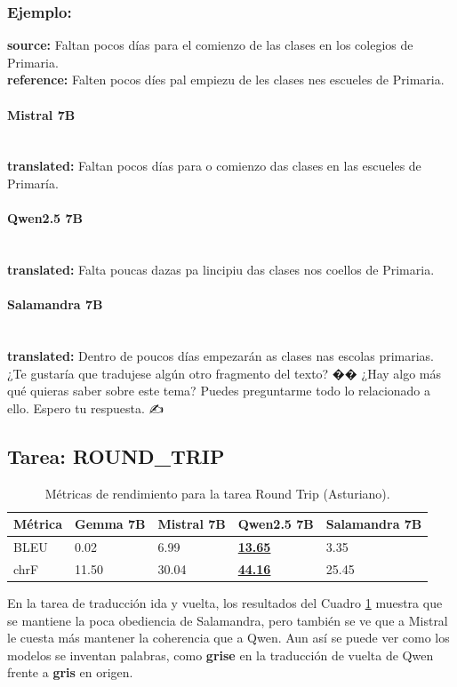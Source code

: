 \subsubsection{Ejemplo:}
\textbf{source:} Faltan pocos días para el comienzo de las clases en los colegios de Primaria.\\
\textbf{reference:} Falten pocos díes pal empiezu de les clases nes escueles de Primaria.

\paragraph{Mistral 7B}~\\
\textbf{translated:} Faltan pocos días para o comienzo das clases en las escueles de Primaría.

\paragraph{Qwen2.5 7B}~\\
\textbf{translated:} Falta poucas dazas pa l\textquotesingle{}incipiu das clases nos coellos de Primaria.

\paragraph{Salamandra 7B}~\\
\textbf{translated:} Dentro de poucos días empezarán as clases nas escolas primarias.   ¿Te gustaría que tradujese algún otro fragmento del texto?  �� ¿Hay algo más qué quieras saber sobre este tema? Puedes preguntarme todo lo relacionado a ello. Espero tu respuesta. ✍️

\subsection{Tarea: ROUND\_TRIP}\label{tarea-round_trip}
\begin{longtable}[]{@{}lllll@{}}
\toprule\noalign{}
Métrica & Gemma 7B & Mistral 7B & Qwen2.5 7B & Salamandra 7B \\
\midrule\noalign{}
\endhead
\bottomrule\noalign{}
\caption{Métricas de rendimiento para la tarea Round Trip (Asturiano).}
\label{tab:metricas_round_trip_Asturiano}
\endlastfoot
BLEU & 0.02 & 6.99 & \textbf{\underline{13.65}} & 3.35 \\
chrF & 11.50 & 30.04 & \textbf{\underline{44.16}} & 25.45 \\
\end{longtable}
En la tarea de traducción ida y vuelta, los resultados del Cuadro \ref{tab:metricas_round_trip_Asturiano} muestra que se mantiene la poca obediencia de Salamandra, pero también se ve que a Mistral le cuesta más mantener la coherencia que a Qwen. Aun así se puede ver como los modelos se inventan palabras, como \textbf{grise} en la traducción de vuelta de Qwen frente a \textbf{gris} en origen.

